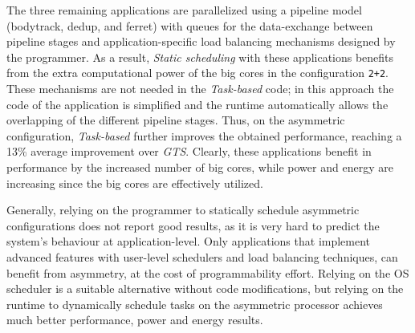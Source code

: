 The three remaining applications are parallelized using a pipeline model (bodytrack, dedup, and ferret)  with queues for the data-exchange between pipeline stages and application-specific load balancing mechanisms designed by the programmer. As a result, \emph{Static scheduling} with these applications benefits from the extra computational power of the big cores in the configuration \texttt{2+2}. These mechanisms are not needed in the \emph{Task-based} code; in this approach the code of the application is simplified and the runtime automatically allows the overlapping of the different pipeline stages. Thus, on the asymmetric configuration, \emph{Task-based} further improves the obtained performance, reaching a 13\% average improvement over \emph{GTS}. Clearly, these applications benefit in performance by the increased number of big cores, while power and energy are increasing since the big cores are effectively utilized.



Generally, relying on the programmer to statically schedule asymmetric configurations does not report good results, as it 
is very hard to predict the system's behaviour at application-level. 
Only applications that implement advanced features with user-level schedulers and load balancing techniques, can benefit from asymmetry, at the cost of programmability effort. 
Relying on the OS scheduler is a suitable alternative without code modifications, but relying on the runtime to dynamically schedule tasks on the asymmetric processor achieves much better performance, power and energy results.



